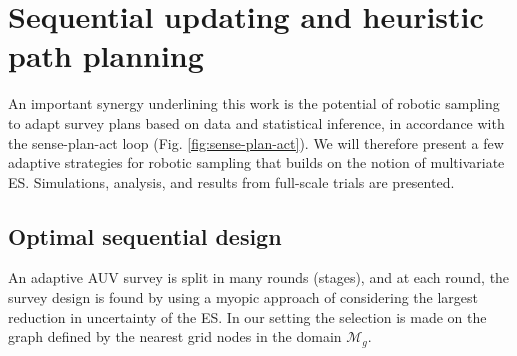 \documentclass[aoas]{imsart}
\begin{document}





\section{Sequential updating and heuristic path planning}\label{sec:heuristics}

An important synergy underlining this work is the potential of robotic sampling to adapt survey plans based on data and statistical inference,
in accordance with the sense-plan-act loop
(Fig. \ref{fig:sense-plan-act}). We will therefore present a few adaptive strategies
for robotic sampling that builds on the notion of multivariate ES. Simulations, analysis, and  results from full-scale trials are presented.

\subsection{Optimal sequential design}
\label{Optdes}

An adaptive AUV survey is split in many rounds (stages), and at each
round, the survey design is found by using a myopic approach of
considering the largest reduction in uncertainty of the ES. In our
setting the selection is made on the graph defined by the nearest grid
nodes in the domain $\mathcal{M}_g$.
\end{document}

